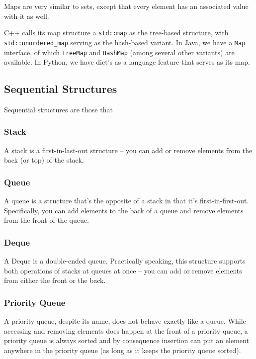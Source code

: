 Maps are very similar to sets, except that every element has an associated value with it as well.

C++ calls its map structure a \texttt{std::map} as the tree-based structure, with \texttt{std::unordered_map} serving as the hash-based variant. In Java, we have a \texttt{Map} interface, of which \texttt{TreeMap} and \texttt{HashMap} (among several other variants) are available. In Python, we have dict's as a language feature that serves as its map.

\subsection{Sequential Structures}

Sequential structures are those that 

\subsubsection{Stack}

A stack is a first-in-last-out structure -- you can add or remove elements from the back (or top) of the stack.

\subsubsection{Queue}

A queue is a structure that's the opposite of a stack in that it's first-in-first-out. Specifically, you can add elements to the back of a queue and remove elements from the front of the queue.

\subsubsection{Deque}

A Deque is a double-ended queue. Practically speaking, this structure supports both operations of stacks at queues at once -- you can add or remove elements from either the front or the back.

\subsubsection{Priority Queue}

A priority queue, despite its name, does not behave exactly like a queue. While accessing and removing elements does happen at the front of a priority queue, a priority queue is always sorted and by consequence insertion can put an element anywhere in the priority queue (as long as it keeps the priority queue sorted).